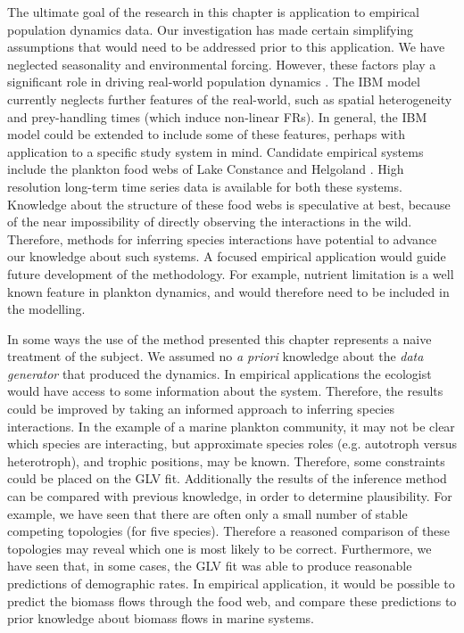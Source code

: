 The ultimate goal of the research in this chapter is application to empirical population dynamics data. Our investigation has made certain simplifying assumptions that would need to be addressed prior to this application. We have neglected seasonality and environmental forcing. However, these factors play a significant role in driving real-world population dynamics \cite{mutshinda2009drives}. The IBM model currently neglects further features of the real-world, such as spatial heterogeneity and prey-handling times (which induce non-linear FRs). In general, the IBM model could be extended to include some of these features, perhaps with application to a specific study system in mind. Candidate empirical systems include the plankton food webs of Lake Constance \cite{straile2000meteorological} and Helgoland \cite{wiltshire2010helgoland}. High resolution long-term time series data is available for both these systems. Knowledge about the structure of these food webs is speculative at best, because of the near impossibility of directly observing the interactions in the wild. Therefore, methods for inferring species interactions have potential to advance our knowledge about such systems. A focused empirical application would guide future development of the methodology. For example, nutrient limitation is a well known feature in plankton dynamics, and would therefore need to be included in the modelling.


In some ways the use of the method presented  this chapter represents a naive treatment of the subject. We assumed no \emph{a priori} knowledge about the \emph{data generator} that produced the dynamics. In empirical applications the ecologist would have access to some information about the system. Therefore, the results could be improved by taking an informed approach to inferring species interactions. In the example of a marine plankton community, it may  not be clear which species are interacting, but approximate species roles (e.g. autotroph versus heterotroph), and trophic positions, may be known. Therefore, some constraints could be placed on the GLV fit. Additionally the results of the inference method can be compared with previous knowledge, in order to determine plausibility. For example, we have seen that there are often only a small number of stable competing topologies (for five species). Therefore a reasoned comparison of these topologies may reveal which one is most likely to be correct. Furthermore, we have seen that, in some cases, the GLV fit was able to produce reasonable predictions of demographic rates. In empirical application, it would be possible to predict the biomass flows through the food web, and compare these predictions to prior knowledge about biomass flows in marine systems.

